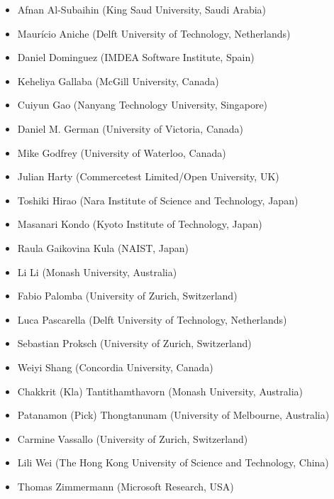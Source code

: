 \documentclass[a4paper]{article}
\begin{document}
\begin{itemize}
\item Afnan Al-Subaihin (King Saud University, Saudi Arabia)
\item Maur\'icio Aniche (Delft University of Technology, Netherlands)
\item Daniel Dominguez (IMDEA Software Institute, Spain)
\item Keheliya Gallaba (McGill University, Canada)
\item Cuiyun Gao (Nanyang Technology University, Singapore)
\item Daniel M. German (University of Victoria, Canada)
\item Mike Godfrey (University of Waterloo, Canada)
\item Julian Harty (Commercetest Limited/Open University, UK)
\item Toshiki Hirao (Nara Institute of Science and Technology, Japan)
\item Masanari Kondo (Kyoto Institute of Technology, Japan)
\item Raula Gaikovina Kula (NAIST, Japan)
\item Li Li (Monash University, Australia)
\item Fabio Palomba (University of Zurich, Switzerland)
\item Luca Pascarella (Delft University of Technology, Netherlands)
\item Sebastian Proksch (University of Zurich, Switzerland)
\item Weiyi Shang (Concordia University, Canada)
\item Chakkrit (Kla) Tantithamthavorn (Monash University, Australia)
\item Patanamon (Pick) Thongtanunam (University of Melbourne, Australia)
\item Carmine Vassallo (University of Zurich, Switzerland)
\item Lili Wei (The Hong Kong University of Science and Technology, China)
\item Thomas Zimmermann (Microsoft Research, USA)
\end{itemize}
\end{document}
